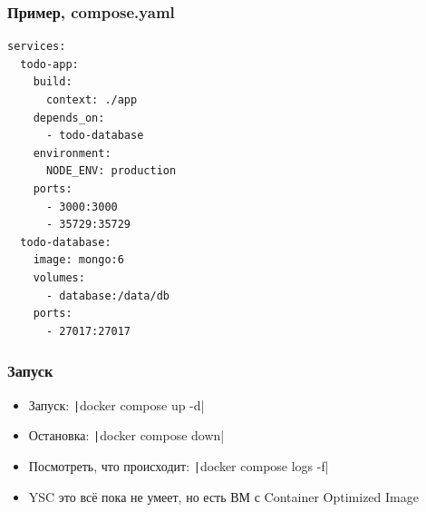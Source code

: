 \documentclass{../../slides-style}
\begin{document}
    \begin{frame}[fragile]
        \frametitle{Пример, compose.yaml}
        \begin{scriptsize}
            \begin{verbatim}
services:
  todo-app:
    build:
      context: ./app
    depends_on:
      - todo-database
    environment:
      NODE_ENV: production
    ports:
      - 3000:3000
      - 35729:35729
  todo-database:
    image: mongo:6
    volumes: 
      - database:/data/db
    ports:
      - 27017:27017
            \end{verbatim}
        \end{scriptsize}
    \end{frame}

    \begin{frame}
        \frametitle{Запуск}
        \begin{itemize}
            \item Запуск: \texttt|docker compose up -d|
            \item Остановка: \texttt|docker compose down|
            \item Посмотреть, что происходит: \texttt|docker compose logs -f|
            \item YSC это всё пока не умеет, но есть ВМ с Container Optimized Image
        \end{itemize}
    \end{frame}
\end{document}
